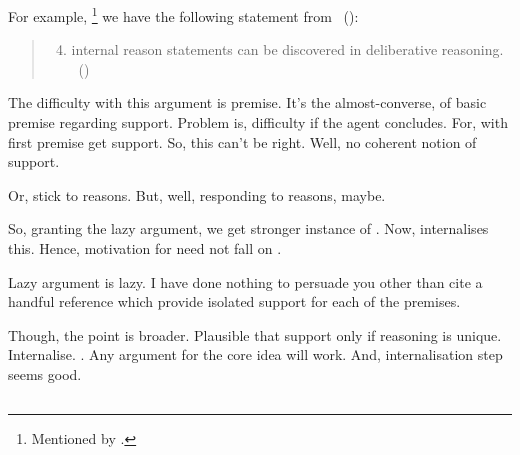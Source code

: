 \begin{note}
  For example,%
  \footnote{Mentioned by \textcite{Way:2016vq}.}
  we have the following statement from~\citeauthor{Williams:1979wi} (\citeyear{Williams:1979wi}):
  \begin{quote}
    \begin{enumerate}[label=(\roman*)]
      \setcounter{enumi}{3}
    \item internal reason statements can be discovered in deliberative reasoning.%
      \mbox{ }\hfill\mbox{(\citeyear[19]{Williams:1979wi})}
    \end{enumerate}
  \end{quote}
\end{note}

\begin{note}
  The difficulty with this argument is premise.
  It's the almost-converse, of basic premise regarding support.
  Problem is, difficulty if the agent concludes.
  For, with first premise get support.
  So, this can't be right.
  Well, no coherent notion of support.

  Or, stick to reasons.
  But, well, responding to reasons, maybe.
\end{note}

\begin{note}
  So, granting the lazy argument, we get stronger instance of \zS{}.
  Now, \qzS{} internalises this.
  Hence, motivation for \qzS{} need not fall on \scen{}.

  Lazy argument is lazy.
  I have done nothing to persuade you other than cite a handful reference which provide isolated support for each of the premises.

  Though, the point is broader.
  Plausible that support only if reasoning is unique.
  Internalise.
  \qzS{}.
  Any argument for the core idea will work.
  And, internalisation step seems good.
\end{note}

\subsection{}
\label{sec:requ3-plus}

